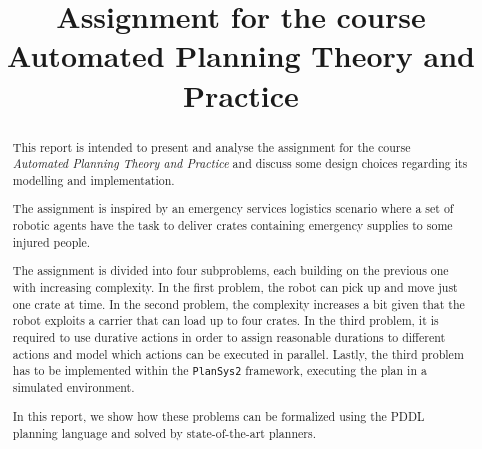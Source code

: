 \documentclass[conference]{IEEEtran}
\begin{document}
\title{Assignment for the course \\Automated Planning Theory and Practice\\
}

\author{
}

\maketitle

\begin{abstract}
This report is intended to present and analyse the assignment \cite{assignment} 
for the course \textit{Automated Planning Theory and Practice}
and discuss some design choices regarding its modelling and implementation.

The assignment is inspired by an emergency services logistics scenario where
a set of robotic agents have the task to deliver crates containing emergency 
supplies to some injured people.

The assignment is divided into four subproblems, each building on the previous 
one with increasing complexity.
In the first problem, the robot can pick up and move just one crate at time.
In the second problem, the complexity increases a bit given that the robot
exploits a carrier that can load up to four crates.
In the third problem, it is required to use durative actions in order to assign
reasonable durations to different actions and model which actions can be executed
in parallel.
Lastly, the third problem has to be implemented within the \texttt{PlanSys2} 
framework, executing the plan in a simulated environment.

In this report, we show how these problems can be formalized using the PDDL planning
language and solved by state-of-the-art planners.

\end{abstract}











% 
% 

\printbibliography %
\end{document}
